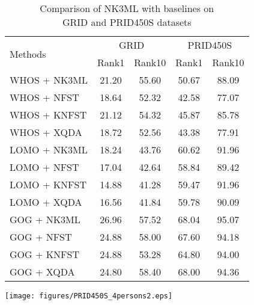 \documentclass[runningheads]{llncs}
\begin{document}
\begin{table}[ht]
\setlength{\abovecaptionskip}{10pt} 
\begin{minipage}[c]{0.59\linewidth}
\centering
    \caption{Comparison of NK3ML with baselines on \\GRID and PRID450S datasets}
\begin{tabular}[t]{|l||c|c||c|c|}
\hline
\multirow{2}{*}{Methods} & \multicolumn{2}{c||}{GRID} & \multicolumn{2}{c|}{PRID450S} \\ \cline{2-5} 
 & Rank1 & Rank10 & Rank1 & Rank10\\
\hline\hline
\small WHOS + \color{red}NK3ML  & \color{red}21.20  & \color{red}55.60  & \color{red}50.67  & \color{red}88.09 \\
WHOS + NFST  & 18.64 & 52.32 & 42.58 &  77.07 \\
WHOS + KNFST & 21.12   & 54.32 & 45.87 &  85.78  \\
WHOS + XQDA  & 18.72  & 52.56  & 43.38  & 77.91\\
\hline \hline
LOMO + \color{red}NK3ML & \color{red}18.24  & \color{red}43.76 & \color{red}60.62 & \color{red}91.96\\
LOMO + NFST  & 17.04 & 42.64 & 58.84 &  89.42\\
LOMO + KNFST & 14.88  & 41.28 & 59.47 &  91.96\\
LOMO + XQDA  & 16.56  & 41.84  & 59.78 & 90.09\\
\hline \hline
GOG + \color{red}NK3ML & \color{red}26.96& \color{red}57.52 & \color{red}68.04  & \color{red}95.07\\
GOG + NFST  & 24.88  & 58.00 & 67.60 & 94.18 \\
GOG + KNFST & 24.88 & 53.28 & 64.80 & 94.00\\
GOG + XQDA  & 24.80 & 58.40 & 68.00 &  94.36\\
\hline
\end{tabular}
    \label{table:GRID:prid450sBaseline}
\end{minipage}\hfill
\begin{minipage}[c]{0.4\linewidth}
\centering
\texttt{[image: figures/PRID450S\_4persons2.eps]}
\label{fig:image}
\end{minipage}
\end{table}
\end{document}
